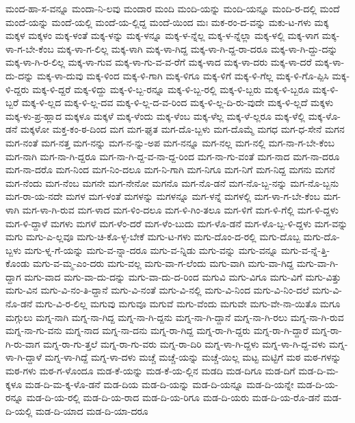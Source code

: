 {ಮಂದ-ಹಾ-ಸ-ವನ್ನೂ
ಮಂದಾ-ನಿ-ಲವು
ಮಂದಾರ
ಮಂದಿ
ಮಂದಿ-ಯನ್ನು
ಮಂದಿ-ಯನ್ನೂ
ಮಂದಿ-ರ-ದಲ್ಲಿ
ಮಂದೆ
ಮಂದೆ-ಯನ್ನು
ಮಂದೆ-ಯಲ್ಲಿ
ಮಂದೆ-ಯ-ಲ್ಲಿದ್ದ
ಮಂದೆ-ಯಿಂದ
ಮಃ
ಮಕ-ರಂ-ದ-ವನ್ನು
ಮಕು-ಟ-ಗಳು
ಮಕ್ಕ
ಮಕ್ಕಳ
ಮಕ್ಕಳಂ
ಮಕ್ಕ-ಳಂತೆ
ಮಕ್ಕ-ಳನ್ನು
ಮಕ್ಕ-ಳನ್ನೂ
ಮಕ್ಕ-ಳ-ನ್ನೆಲ್ಲ
ಮಕ್ಕ-ಳ-ನ್ನೆಲ್ಲಾ
ಮಕ್ಕ-ಳಲ್ಲಿ
ಮಕ್ಕ-ಳಾಗ
ಮಕ್ಕ-ಳಾ-ಗ-ಬೇ-ಕೆಂಬ
ಮಕ್ಕ-ಳಾ-ಗ-ಲಿಲ್ಲ
ಮಕ್ಕ-ಳಾಗಿ
ಮಕ್ಕ-ಳಾ-ಗಿದ್ದ
ಮಕ್ಕ-ಳಾ-ಗಿ-ದ್ದ-ರಾ-ದರೂ
ಮಕ್ಕ-ಳಾ-ಗಿ-ದ್ದು-ದನ್ನು
ಮಕ್ಕ-ಳಾ-ಗಿ-ರ-ಲಿಲ್ಲ
ಮಕ್ಕ-ಳಾ-ಗುವ
ಮಕ್ಕ-ಳಾ-ಗು-ವ-ವ-ರೆಗೆ
ಮಕ್ಕ-ಳಾದ
ಮಕ್ಕ-ಳಾ-ದರು
ಮಕ್ಕ-ಳಾ-ದರೆ
ಮಕ್ಕ-ಳಾ-ದು-ದನ್ನು
ಮಕ್ಕ-ಳಾ-ದುವು
ಮಕ್ಕ-ಳಿಂದ
ಮಕ್ಕ-ಳಿ-ಗಾಗಿ
ಮಕ್ಕ-ಳಿಗೂ
ಮಕ್ಕ-ಳಿಗೆ
ಮಕ್ಕ-ಳಿ-ಗೆಲ್ಲ
ಮಕ್ಕ-ಳಿ-ಗೊ-ಪ್ಪಿಸಿ
ಮಕ್ಕ-ಳಿ-ದ್ದರು
ಮಕ್ಕ-ಳಿ-ದ್ದರೆ
ಮಕ್ಕ-ಳಿದ್ದು
ಮಕ್ಕ-ಳಿ-ಬ್ಬ-ರನ್ನೂ
ಮಕ್ಕ-ಳಿ-ಬ್ಬ-ರಲ್ಲಿ
ಮಕ್ಕ-ಳಿ-ಬ್ಬರು
ಮಕ್ಕ-ಳಿ-ಬ್ಬರೂ
ಮಕ್ಕ-ಳಿ-ಬ್ಬರೆ
ಮಕ್ಕ-ಳಿ-ಲ್ಲದ
ಮಕ್ಕ-ಳಿ-ಲ್ಲ-ದವ
ಮಕ್ಕ-ಳಿ-ಲ್ಲ-ದ-ವ-ರಿಂದ
ಮಕ್ಕ-ಳಿ-ಲ್ಲ-ದಿ-ರು-ವುದೇ
ಮಕ್ಕ-ಳಿ-ಲ್ಲದೆ
ಮಕ್ಕಳು
ಮಕ್ಕ-ಳು-ಪ್ರ-ಹ್ಲಾದ
ಮಕ್ಕಳೂ
ಮಕ್ಕಳೆ
ಮಕ್ಕ-ಳೆಂದು
ಮಕ್ಕ-ಳೆಂಬ
ಮಕ್ಕ-ಳೆಲ್ಲ
ಮಕ್ಕ-ಳೆ-ಲ್ಲರೂ
ಮಕ್ಕ-ಳೆಲ್ಲಿ
ಮಕ್ಕ-ಳೊ-ಡನೆ
ಮಕ್ಕಳೋ
ಮಕ್ತ-ಕಂ-ಠ-ದಿಂದ
ಮಗ
ಮಗ-ಘೃತ
ಮಗ-ದೊ-ಬ್ಬಳು
ಮಗ-ದೊಮ್ಮೆ
ಮಗಧ
ಮಗ-ಧ-ಸೇನೆ
ಮಗನ
ಮಗ-ನಂತೆ
ಮಗ-ನತ್ತ
ಮಗ-ನನ್ನು
ಮಗ-ನ-ನ್ನು-ಅಪ
ಮಗ-ನನ್ನೂ
ಮಗ-ನಲ್ಲ
ಮಗ-ನಲ್ಲಿ
ಮಗ-ನಾ-ಗ-ಬೇ-ಕೆಂಬ
ಮಗ-ನಾಗಿ
ಮಗ-ನಾ-ಗಿ-ದ್ದರೂ
ಮಗ-ನಾ-ಗಿ-ದ್ದ-ವ-ನಾ-ದ್ದ-ರಿಂದ
ಮಗ-ನಾ-ಗು-ವಂತೆ
ಮಗ-ನಾದ
ಮಗ-ನಾ-ದರೂ
ಮಗ-ನಾ-ದರೊ
ಮಗ-ನಿಂದ
ಮಗ-ನಿಂ-ದಲೂ
ಮಗ-ನಿ-ಗಾಗಿ
ಮಗ-ನಿಗೂ
ಮಗ-ನಿಗೆ
ಮಗ-ನಿದ್ದ
ಮಗನು
ಮಗನೆ
ಮಗ-ನೆಂದು
ಮಗ-ನೆಂಬ
ಮಗನೇ
ಮಗ-ನೇನೋ
ಮಗನೊ
ಮಗ-ನೊ-ಡನೆ
ಮಗ-ನೊ-ಬ್ಬ-ನನ್ನು
ಮಗ-ನೊ-ಬ್ಬನು
ಮಗ-ರಾ-ಯ-ನದೇ
ಮಗಳ
ಮಗ-ಳಂತೆ
ಮಗಳನ್ನು
ಮಗಳನ್ನೂ
ಮಗ-ಳನ್ನೆ
ಮಗಳಲ್ಲಿ
ಮಗ-ಳಾ-ಗ-ಬೇ-ಕೆಂಬ
ಮಗ-ಳಾಗಿ
ಮಗ-ಳಾ-ಗಿ-ರುವ
ಮಗ-ಳಾದ
ಮಗ-ಳಿಂ-ದಲೂ
ಮಗ-ಳಿ-ಗಿಂ-ತಲೂ
ಮಗ-ಳಿಗೆ
ಮಗ-ಳಿ-ಗೆಲ್ಲಿ
ಮಗ-ಳಿ-ದ್ದಳು
ಮಗ-ಳಿ-ದ್ದಾಳೆ
ಮಗಳು
ಮಗಳೆ
ಮಗ-ಳೆಂ-ದರೆ
ಮಗ-ಳೆಂ-ಬುದು
ಮಗ-ಳೊ-ಡನೆ
ಮಗ-ಳೊ-ಬ್ಬ-ಳಿ-ದ್ದಳು
ಮಗ-ವನ್ನು
ಮಗು
ಮಗು-ಎ-ಲ್ಲವೂ
ಮಗು-ಚಿ-ಕೊ-ಳ್ಳ-ಬೇಕೆ
ಮಗು-ಟ-ಗಳು
ಮಗು-ದೊಂ-ದ-ರಲ್ಲಿ
ಮಗು-ದೊಬ್ಬ
ಮಗು-ದೊ-ಬ್ಬಳು
ಮಗು-ಳ್ನ-ಗೆ-ಯನ್ನು
ಮಗು-ವ-ನ್ನಾ-ದರೂ
ಮಗು-ವ-ನ್ನಿಡು
ಮಗು-ವನ್ನು
ಮಗು-ವನ್ನೂ
ಮಗು-ವ-ನ್ನೆ-ತ್ತಿ-ಕೊಂಡು
ಮಗು-ವ-ಮ್ಮ-ಎಂ-ದರು
ಮಗು-ವಲ್ಲ
ಮಗು-ವಾ-ಗ-ಲೆಂದು
ಮಗು-ವಾಗಿ
ಮಗು-ವಾ-ಗಿದ್ದ
ಮಗು-ವಾ-ಗಿ-ದ್ದಾಗ
ಮಗು-ವಾದ
ಮಗು-ವಾ-ದು-ದನ್ನು
ಮಗು-ವಾ-ದು-ದ-ರಿಂದ
ಮಗುವಿ
ಮಗು-ವಿಗೂ
ಮಗು-ವಿಗೆ
ಮಗು-ವಿತ್ತು
ಮಗು-ವಿನ
ಮಗು-ವಿ-ನಂ-ತಿ-ದ್ದಾನೆ
ಮಗು-ವಿ-ನಂತೆ
ಮಗು-ವಿ-ನಲ್ಲಿ
ಮಗು-ವಿ-ನಿಂದ
ಮಗು-ವಿ-ನಿಂ-ದಲೆ
ಮಗು-ವಿ-ನೊ-ಡನೆ
ಮಗು-ವಿ-ರ-ಲಿಲ್ಲ
ಮಗುವು
ಮಗುವೂ
ಮಗುವೆ
ಮಗು-ವೆಂದು
ಮಗುವೇ
ಮಗು-ವೇ-ನಾ-ಯಿತೊ
ಮಗೂ
ಮಗ್ಗುಲು
ಮಗ್ನ-ನಾಗಿ
ಮಗ್ನ-ನಾ-ಗಿದ್ದ
ಮಗ್ನ-ನಾ-ಗಿ-ದ್ದನು
ಮಗ್ನ-ನಾ-ಗಿ-ದ್ದಾನೆ
ಮಗ್ನ-ನಾ-ಗಿ-ರಲು
ಮಗ್ನ-ನಾ-ಗಿ-ರುವ
ಮಗ್ನ-ನಾ-ಗು-ವನು
ಮಗ್ನ-ನಾದ
ಮಗ್ನ-ನಾ-ದನು
ಮಗ್ನ-ರಾ-ಗಿದ್ದ
ಮಗ್ನ-ರಾ-ಗಿ-ದ್ದರು
ಮಗ್ನ-ರಾ-ಗಿ-ದ್ದಾರೆ
ಮಗ್ನ-ರಾ-ಗಿ-ರು-ವಾಗ
ಮಗ್ನ-ರಾ-ಗು-ತ್ತಲೆ
ಮಗ್ನ-ರಾ-ಗು-ವರು
ಮಗ್ನ-ರಾ-ದಿರಿ
ಮಗ್ನ-ಳಾ-ಗಿ-ದ್ದಳು
ಮಗ್ನ-ಳಾ-ಗಿ-ದ್ದ-ವಳು
ಮಗ್ನ-ಳಾ-ಗಿ-ದ್ದಾಳೆ
ಮಗ್ನ-ಳಾ-ಗಿದ್ದೆ
ಮಗ್ನ-ಳಾ-ದಳು
ಮಚ್ಚೆ
ಮಚ್ಚೆ-ಯನ್ನು
ಮಚ್ಚೆ-ಯಿಲ್ಲ
ಮಟ್ಟ
ಮಟ್ಟಿಗೆ
ಮಠ
ಮಠ-ಗಳನ್ನು
ಮಠ-ಗಳು
ಮಠ-ಗ-ಳೊಂದೂ
ಮಡ-ಕೆ-ಯನ್ನು
ಮಡ-ಕೆ-ಯ-ಲ್ಲಿನ
ಮಡದಿ
ಮಡ-ದಿಗೂ
ಮಡ-ದಿಗೆ
ಮಡ-ದಿ-ಮ-ಕ್ಕಳೂ
ಮಡ-ದಿ-ಮ-ಕ್ಕ-ಳೊ-ಡನೆ
ಮಡ-ದಿಯ
ಮಡ-ದಿ-ಯನ್ನು
ಮಡ-ದಿ-ಯನ್ನೂ
ಮಡ-ದಿ-ಯನ್ನೇ
ಮಡ-ದಿ-ಯ-ರನ್ನೂ
ಮಡ-ದಿ-ಯ-ರಲ್ಲಿ
ಮಡ-ದಿ-ಯ-ರಾದ
ಮಡ-ದಿ-ಯ-ರಿಗೂ
ಮಡ-ದಿ-ಯರು
ಮಡ-ದಿ-ಯ-ರೊ-ಡನೆ
ಮಡ-ದಿ-ಯಲ್ಲಿ
ಮಡ-ದಿ-ಯಾದ
ಮಡ-ದಿ-ಯಾ-ದರೂ
}
